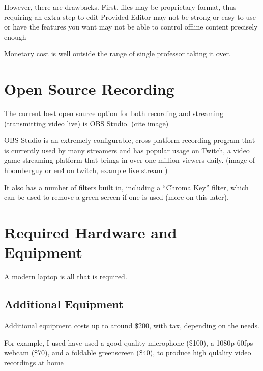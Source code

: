 \documentclass[sigconf]{acmart}
\begin{document}
However, there are drawbacks.
First, files may be proprietary format, thus requiring an extra step to edit
Provided Editor may not be strong or easy to use or have the features you want
may not be able to control offline content precisely enough

Monetary cost is well outside the range of single professor taking it over.

\section{Open Source Recording}
\label{opensource}
The current best open source option for both recording and streaming (transmitting video live) is OBS Studio. (cite image)

OBS Studio is an extremely configurable, cross-platform recording program that is currently used by many streamers and has popular usage on Twitch, a video game streaming platform that brings in over one million viewers daily.  (image of hbomberguy or eu4 on twitch, example live stream )

It also has a number of filters built in, including a  ``Chroma Key'' filter, which can be used to remove a green screen if one is used (more on this later).



\section{Required Hardware and Equipment}
\label{hardware}
A modern laptop is all that is required.








\subsection{Additional Equipment}
Additional equipment costs up to around \$200, with tax, depending on the needs.

For example, I used have used a good quality microphone (\$100), a 1080p 60fps webcam (\$70), and a foldable greenscreen (\$40), to produce high qulality video recordings at home
\end{document}
